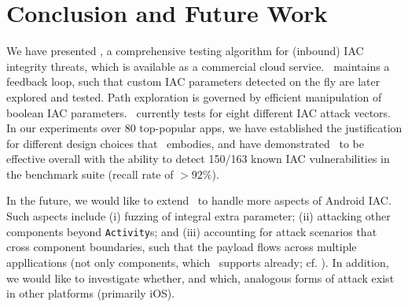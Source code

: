 \section{Conclusion and Future Work}\label{Se:conclusion}

We have presented \Tool, a comprehensive testing algorithm for (inbound) IAC integrity threats, which is available as a commercial cloud service. \Tool\
maintains a feedback loop, such that custom IAC parameters detected on the fly are later explored and tested. Path exploration is governed by efficient manipulation of boolean IAC parameters. \Tool\ currently tests for eight different IAC attack vectors. In our experiments over 80 top-popular apps, we have established the justification for different design choices that \Tool\ embodies, and have demonstrated \Tool\ to be effective overall with the ability to detect 150/163 known IAC vulnerabilities in the benchmark suite (recall rate of $>92\%$).

In the future, we would like to extend \Tool\ to handle more aspects of Android IAC. Such aspects include (i) fuzzing of integral extra parameter; (ii) attacking other components beyond {\tt Activity}s; and (iii) accounting for attack scenarios that cross component boundaries, such that the payload flows across multiple appllications (not only components, which \Tool\ supports already; cf. \cite{RALB:ARES14}). In addition, we would like to investigate whether, and which, analogous forms of attack exist in other platforms (primarily iOS).


